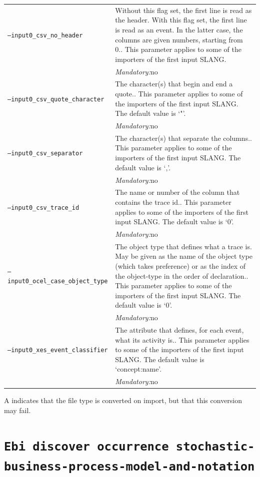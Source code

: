 {\begin{tabularx}{\linewidth}{lX}
\texttt{--input0\_csv\_no\_header} & Without this flag set, the first line is read as the header. 
    With this flag set, the first line is read as an event. In the latter case, the columns are given numbers, starting from 0.. This parameter applies to some of the importers of the first input SLANG. \\
&\textit{Mandatory:}\quad no\\
\texttt{--input0\_csv\_quote\_character} & The character(s) that begin and end a quote.. This parameter applies to some of the importers of the first input SLANG. The default value is `"'.\\
&\textit{Mandatory:}\quad no\\
\texttt{--input0\_csv\_separator} & The character(s) that separate the columns.. This parameter applies to some of the importers of the first input SLANG. The default value is `,'.\\
&\textit{Mandatory:}\quad no\\
\texttt{--input0\_csv\_trace\_id} & The name or number of the column that contains the trace id.. This parameter applies to some of the importers of the first input SLANG. The default value is `0'.\\
&\textit{Mandatory:}\quad no\\
\texttt{--input0\_ocel\_case\_object\_type} & The object type that defines what a trace is. May be given as the name of the object type (which takes preference) or as the index of the object-type in the order of declaration.. This parameter applies to some of the importers of the first input SLANG. The default value is `0'.\\
&\textit{Mandatory:}\quad no\\
\texttt{--input0\_xes\_event\_classifier} & The attribute that defines, for each event, what its activity is.. This parameter applies to some of the importers of the first input SLANG. The default value is `concept:name'.\\
&\textit{Mandatory:}\quad no\\
\bottomrule
\end{tabularx}
A \textdagger{} indicates that the file type is converted on import, but that this conversion may fail.
\clearpage\section{\texttt{Ebi discover occurrence stochastic-business-process-model-and-notation}}
\label{command:Ebi discover occurrence stochastic-business-process-model-and-notation}
}
